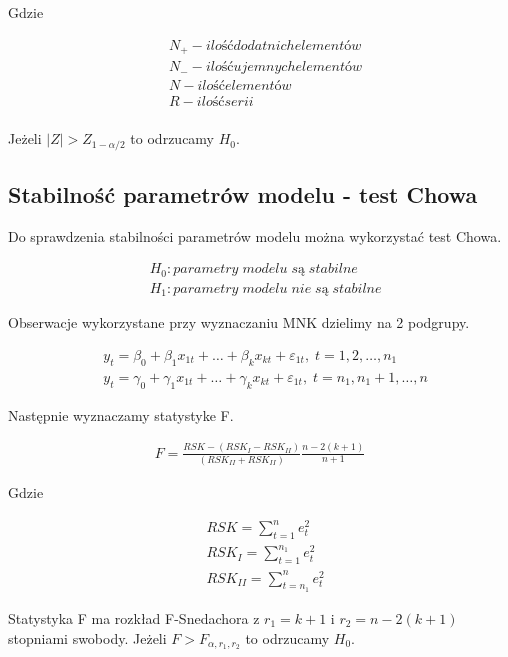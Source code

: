 Gdzie

\begin{equation}
    \begin{split}
        &N_+ - ilość dodatnich elementów \\
        &N_- - ilość ujemnych elementów \\
        &N - ilość elementów \\
        &R - ilość serii \\
    \end{split}
\end{equation}


Jeżeli \(|Z| > Z_{1-\alpha/2}\) to odrzucamy \(H_0\).

\subsection{Stabilność parametrów modelu - test Chowa}\label{subsec:stabilność-parametrów-modelu}

Do sprawdzenia stabilności parametrów modelu można wykorzystać test Chowa.

\begin{equation}
    \begin{split}
        &H_0: parametry \;  modelu \; są \; stabilne \\
        &H_1: parametry \;  modelu \; nie \; są \; stabilne
    \end{split}
\end{equation}

Obserwacje wykorzystane przy wyznaczaniu MNK dzielimy na 2 podgrupy.

\begin{equation}
    \begin{split}
        &y_t = \beta_0 + \beta_{1}x_{1t} + \dots + \beta_{k}x_{kt} + \varepsilon_{1t}, \;  t= 1,2, \dots , n_1  \\
        &y_t = \gamma_0 + \gamma_{1}x_{1t} + \dots + \gamma_{k}x_{kt} + \varepsilon_{1t}, \;  t= n_1,n_1 +1, \dots , n
    \end{split}
\end{equation}

Następnie wyznaczamy statystyke F.

\begin{equation}
    \begin{split}
        F = \frac{RSK - (RSK_I - RSK_{II})}{(RSK_{II}  + RSK_{II})} \frac{n-2(k+1)}{n+1}
    \end{split}
\end{equation}

Gdzie

\begin{equation}
    \begin{split}
        &RSK = \sum_{t=1}^{n} e_{t}^{2} \\
        &RSK_{I} = \sum_{t=1}^{n_1} e_{t}^{2} \\
        &RSK_{II} = \sum_{t=n_1}^{n} e_{t}^{2}
    \end{split}
\end{equation}

Statystyka F ma rozkład F-Snedachora z \(r_1=k+1 \) i \(r_2= n -2(k+1) \) stopniami swobody.
Jeżeli \( F > F_{\alpha,r_1,r_2} \) to odrzucamy \(H_{0}\).